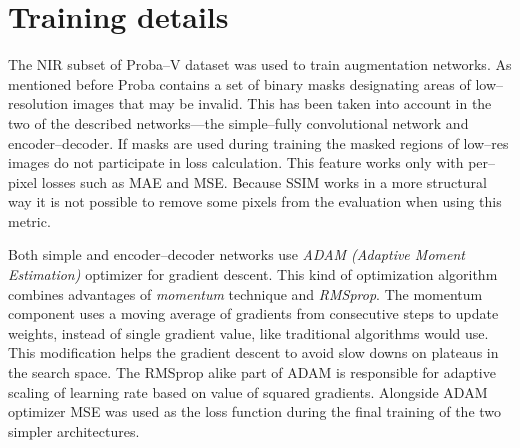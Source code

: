 \section{Training details}
The NIR subset of Proba--V dataset was used to train augmentation networks.
As mentioned before Proba contains a set of binary masks designating areas of low--resolution images that may be invalid.
This has been taken into account in the two of the described networks---the simple--fully convolutional network and encoder--decoder.
If masks are used during training the masked regions of low--res images do not participate in loss calculation.
This feature works only with per--pixel losses such as MAE and MSE.
Because SSIM works in a more structural way it is not possible to remove some pixels from the evaluation when using this metric.

Both simple and encoder--decoder networks use \textit{ADAM (Adaptive Moment Estimation)} optimizer for gradient descent.
This kind of optimization algorithm combines advantages of \textit{momentum} technique and \textit{RMSprop}.
The momentum component uses a moving average of gradients from consecutive steps to update weights, instead of single gradient value, like traditional algorithms would use.
This modification helps the gradient descent to avoid slow downs on plateaus in the search space.
The RMSprop alike part of ADAM is responsible for adaptive scaling of learning rate based on value of squared gradients.
Alongside ADAM optimizer MSE was used as the loss function during the final training of the two simpler architectures.

